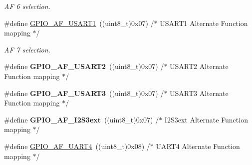 \begin{DoxyCompactItemize}
\begin{DoxyCompactList}\small\item\em A\-F 6 selection. \end{DoxyCompactList}\item 
\hypertarget{group___g_p_i_o___alternat__function__selection__define_ga790e1f37e75f475cf09c211f566fb069}{\#define \hyperlink{group___g_p_i_o___alternat__function__selection__define_ga790e1f37e75f475cf09c211f566fb069}{G\-P\-I\-O\-\_\-\-A\-F\-\_\-\-U\-S\-A\-R\-T1}~((uint8\-\_\-t)0x07)  /$\ast$ U\-S\-A\-R\-T1 Alternate Function mapping $\ast$/}\label{group___g_p_i_o___alternat__function__selection__define_ga790e1f37e75f475cf09c211f566fb069}

\begin{DoxyCompactList}\small\item\em A\-F 7 selection. \end{DoxyCompactList}\item 
\hypertarget{group___g_p_i_o___alternat__function__selection__define_ga5e74db1f4d0fc3527aa067093625171b}{\#define {\bfseries G\-P\-I\-O\-\_\-\-A\-F\-\_\-\-U\-S\-A\-R\-T2}~((uint8\-\_\-t)0x07)  /$\ast$ U\-S\-A\-R\-T2 Alternate Function mapping $\ast$/}\label{group___g_p_i_o___alternat__function__selection__define_ga5e74db1f4d0fc3527aa067093625171b}

\item 
\hypertarget{group___g_p_i_o___alternat__function__selection__define_ga97742da355d32c599527813eaf109ec7}{\#define {\bfseries G\-P\-I\-O\-\_\-\-A\-F\-\_\-\-U\-S\-A\-R\-T3}~((uint8\-\_\-t)0x07)  /$\ast$ U\-S\-A\-R\-T3 Alternate Function mapping $\ast$/}\label{group___g_p_i_o___alternat__function__selection__define_ga97742da355d32c599527813eaf109ec7}

\item 
\hypertarget{group___g_p_i_o___alternat__function__selection__define_ga8fac28d42bc99794bb74707c141fc0f6}{\#define {\bfseries G\-P\-I\-O\-\_\-\-A\-F\-\_\-\-I2\-S3ext}~((uint8\-\_\-t)0x07)  /$\ast$ I2\-S3ext Alternate Function mapping $\ast$/}\label{group___g_p_i_o___alternat__function__selection__define_ga8fac28d42bc99794bb74707c141fc0f6}

\item 
\hypertarget{group___g_p_i_o___alternat__function__selection__define_gad1754187e64b66681cc1447695062706}{\#define \hyperlink{group___g_p_i_o___alternat__function__selection__define_gad1754187e64b66681cc1447695062706}{G\-P\-I\-O\-\_\-\-A\-F\-\_\-\-U\-A\-R\-T4}~((uint8\-\_\-t)0x08)  /$\ast$ U\-A\-R\-T4 Alternate Function mapping $\ast$/}\label{group___g_p_i_o___alternat__function__selection__define_gad1754187e64b66681cc1447695062706}


\end{DoxyCompactItemize}
